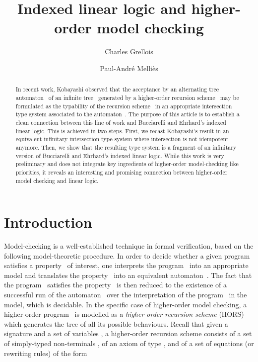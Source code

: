 \documentclass{eptcs}
\newcommand{\G}{}
\begin{document}
\title{Indexed linear logic and higher-order model checking}
\author{Charles Grellois
 \and Paul-Andr\'e Melli\`es
}
\def\titlerunning{Indexed linear logic and higher-order model-checking}
\def\authorrunning{C. Grellois and P.-A. Melli\`es}
\maketitle
\begin{abstract}
In recent work, Kobayashi observed
that the acceptance by an alternating tree automaton~
of an infinite tree~ generated by a higher-order recursion scheme~
may be formulated as the typability of the recursion scheme~
in an appropriate intersection type system associated to the automaton~.
The purpose of this article is to establish a clean connection between
this line of work and Bucciarelli and Ehrhard's indexed linear logic.
This is achieved in two steps.
First, we recast Kobayashi's result in an equivalent infinitary intersection type system
where intersection is not idempotent anymore.
Then, we show that the resulting type system is a fragment of an infinitary version 
of Bucciarelli and Ehrhard's indexed linear logic.
While this work is very preliminary and does not integrate
key ingredients of higher-order model-checking like priorities,
it reveals an interesting and promising connection between higher-order model checking
and linear logic.
\end{abstract}

\section{Introduction}
Model-checking is a well-established technique in formal verification,
based on the following model-theoretic procedure.
In order to decide whether a given program~ satisfies a property~ of interest,
one interprets the program~ into an appropriate model and translates 
the property~ into an equivalent automaton~.
The fact that the program~ satisfies the property~ is then reduced 
to the existence of a successful run of the automaton~ 
over the interpretation of the program~ in the model, which is decidable.
In the specific case of higher-order model checking, a higher-order program~ 
is modelled as a \emph{higher-order recursion scheme} (HORS)
which generates the tree of all its possible behaviours.
Recall that given a signature  and a set of variables , 
a higher-order recursion scheme \G consists of a set of simply-typed 
non-terminals ,  of an axiom  of type , and of a set of equations (or rewriting rules) of the form
\end{document}
